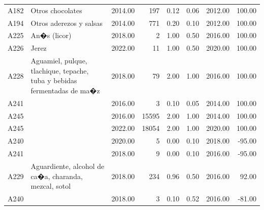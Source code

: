 \begin{table}[ht]
\begin{tabular}{llrrrrrr}
  A182 & Otros chocolates & 2014.00 & 197 & 0.12 & 0.06 & 2012.00 & 100.00 \\ 
  A194 & Otros aderezos y salsas & 2014.00 & 771 & 0.20 & 0.10 & 2012.00 & 100.00 \\ 
  A225 & An�s (licor) & 2018.00 &   2 & 1.00 & 0.50 & 2016.00 & 100.00 \\ 
  A226 & Jerez & 2022.00 &  11 & 1.00 & 0.50 & 2020.00 & 100.00 \\ 
  A228 & Aguamiel, pulque, tlachique, tepache, tuba y bebidas fermentadas de ma�z & 2018.00 &  79 & 2.00 & 1.00 & 2016.00 & 100.00 \\ 
  A241 &  & 2016.00 &   3 & 0.10 & 0.05 & 2014.00 & 100.00 \\ 
  A245 &  & 2016.00 & 15595 & 2.00 & 1.00 & 2014.00 & 100.00 \\ 
  A245 &  & 2022.00 & 18054 & 2.00 & 1.00 & 2020.00 & 100.00 \\ 
  A240 &  & 2020.00 &   5 & 0.00 & 0.10 & 2018.00 & -95.00 \\ 
  A241 &  & 2018.00 &   9 & 0.00 & 0.10 & 2016.00 & -95.00 \\ 
  A229 & Aguardiente, alcohol de ca�a, charanda, mezcal, sotol & 2018.00 & 234 & 0.96 & 0.50 & 2016.00 & 92.00 \\ 
  A240 &  & 2018.00 &   3 & 0.10 & 0.52 & 2016.00 & -81.00 \\ 
   \bottomrule
\end{tabular}
\end{table}
